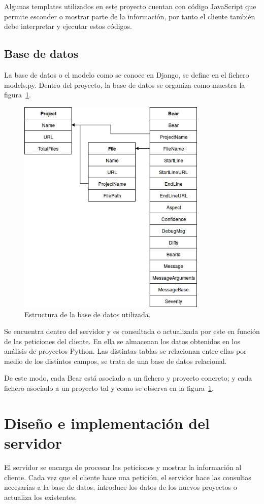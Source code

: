 \documentclass[a4paper, 12pt]{book}
\begin{document}
Algunas templates utilizados en este proyecto cuentan con código JavaScript que permite esconder o mostrar parte de la información, por tanto el cliente también debe interpretar y ejecutar estos códigos.

\subsection{Base de datos}
\label{sec:seccion11.3}
La base de datos o el modelo como se conoce en Django, se define en el fichero models.py. Dentro del proyecto, la base de datos se organiza como muestra la figura~\ref{fig:EstructuraBBDD}.
\begin{figure}[H]
  \centering
  \includegraphics[width=9cm, keepaspectratio]{img/EstructuraBBDD}
  \caption{Estructura de la base de datos utilizada.}
  \label{fig:EstructuraBBDD}
\end{figure}
Se encuentra dentro del servidor y es consultada o actualizada por este en función de las peticiones del cliente. En ella se almacenan los datos obtenidos en los análisis de proyectos Python. Las distintas tablas se relacionan entre ellas por medio de los distintos campos, se trata de una base de datos relacional.

De este modo, cada Bear está asociado a un fichero y proyecto concreto; y cada fichero asociado a un proyecto tal y como se observa en la figura~\ref{fig:EstructuraBBDD}.

\section{Diseño e implementación del servidor} 
\label{sec:seccion12}
El servidor se encarga de procesar las peticiones y mostrar la información al cliente. Cada vez que el cliente hace una petición, el servidor hace las consultas necesarias a la base de datos, introduce los datos de los nuevos proyectos o actualiza los existentes.
\end{document}
